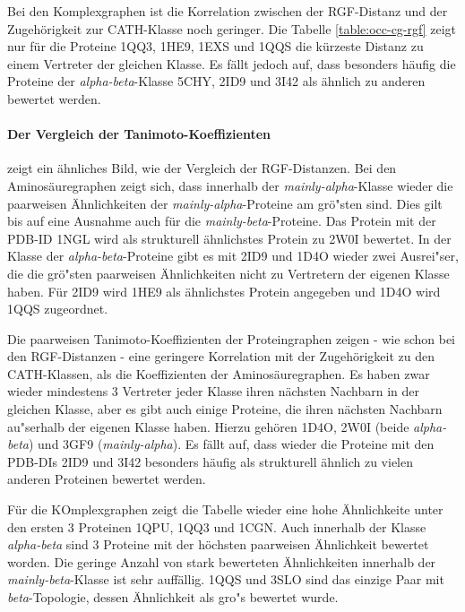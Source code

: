 \documentclass{report}
\begin{document}
Bei den Komplexgraphen ist die Korrelation zwischen der RGF-Distanz und der Zugeh\"origkeit zur CATH-Klasse noch geringer. Die Tabelle \ref{table:occ-cg-rgf} zeigt nur f\"ur die Proteine 1QQ3, 1HE9, 1EXS und 1QQS die k\"urzeste Distanz zu einem Vertreter der gleichen Klasse.
Es f\"allt jedoch auf, dass besonders h\"aufig die Proteine der \textit{alpha-beta}-Klasse 5CHY, 2ID9 und 3I42 als \"ahnlich zu anderen bewertet werden.

\paragraph{Der Vergleich der Tanimoto-Koeffizienten}
zeigt ein \"ahnliches Bild, wie der Vergleich der RGF-Distanzen. Bei den Aminos\"auregraphen zeigt sich, dass innerhalb der \textit{mainly-alpha}-Klasse wieder die paarweisen \"Ahnlichkeiten der \textit{mainly-alpha}-Proteine am gr\"o"sten sind. Dies gilt bis auf eine Ausnahme auch f\"ur die \textit{mainly-beta}-Proteine. Das Protein mit der PDB-ID 1NGL wird als strukturell \"ahnlichstes Protein zu 2W0I bewertet. In der Klasse der \textit{alpha-beta}-Proteine gibt es mit 2ID9 und 1D4O wieder zwei Ausrei"ser, die die gr\"o"sten paarweisen \"Ahnlichkeiten nicht zu Vertretern der eigenen Klasse haben. F\"ur 2ID9 wird 1HE9 als \"ahnlichstes Protein angegeben und 1D4O wird 1QQS zugeordnet.

Die paarweisen Tanimoto-Koeffizienten der Proteingraphen zeigen - wie schon bei den RGF-Distanzen - eine geringere Korrelation mit der Zugeh\"origkeit zu den CATH-Klassen, als die Koeffizienten der Aminos\"auregraphen. Es haben zwar wieder mindestens 3 Vertreter jeder Klasse ihren n\"achsten Nachbarn in der gleichen Klasse, aber es gibt auch einige Proteine, die ihren n\"achsten Nachbarn au"serhalb der eigenen Klasse haben. Hierzu geh\"oren 1D4O, 2W0I (beide \textit{alpha-beta}) und 3GF9 (\textit{mainly-alpha}). Es f\"allt auf, dass wieder die Proteine mit den PDB-DIs 2ID9 und 3I42 besonders h\"aufig als strukturell \"ahnlich zu vielen anderen Proteinen bewertet werden.

F\"ur die KOmplexgraphen zeigt die Tabelle wieder eine hohe \"Ahnlichkeite unter den ersten 3 Proteinen 1QPU, 1QQ3 und 1CGN. Auch innerhalb der Klasse \textit{alpha-beta} sind 3 Proteine mit der h\"ochsten paarweisen \"Ahnlichkeit bewertet worden. Die geringe Anzahl von stark bewerteten \"Ahnlichkeiten innerhalb der \textit{mainly-beta}-Klasse ist sehr auff\"allig. 1QQS und 3SLO sind das einzige Paar mit \textit{beta}-Topologie, dessen \"Ahnlichkeit als gro"s bewertet wurde.
\end{document}

